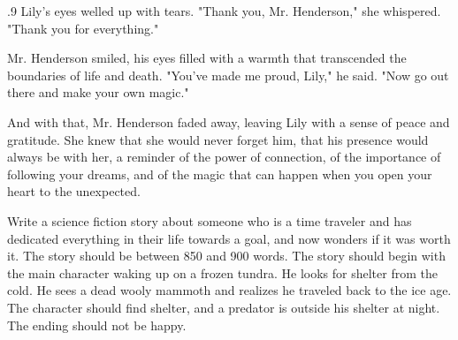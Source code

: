 \documentclass{article}
\newcommand{\Agentsroomzs}{\textsc{Agents' Room$_{ZS}$}}
\begin{document}
\begin{tcolorbox}[colback=white, colframe=gray!30!white, coltitle=black, parskip=5mm, title=
    \textbf{System output: \Agentsroomzs}, breakable]
\begin{spacing}{.9}
Lily's eyes welled up with tears. "Thank you, Mr. Henderson," she whispered. "Thank you for everything."\\\par

Mr. Henderson smiled, his eyes filled with a warmth that transcended the boundaries of life and death. "You've made me proud, Lily," he said. "Now go out there and make your own magic."\\\par

And with that, Mr. Henderson faded away, leaving Lily with a sense of peace and gratitude. She knew that she would never forget him, that his presence would always be with her, a reminder of the power of connection, of the importance of following your dreams, and of the magic that can happen when you open your heart to the unexpected.
    \end{spacing}
\end{tcolorbox}
    
\newpage
\begin{tcolorbox}[colback=white, colframe=my-green, coltitle=black, parskip=5mm, title=
    \textbf{Example Prompt}, breakable]
  \scriptsize
Write a science fiction story about someone who is a time traveler and has dedicated everything in their life towards a goal, and now wonders if it was worth it. The story should be between 850 and 900 words. The story should begin with the main character waking up on a frozen tundra. He looks for shelter from the cold. He sees a dead wooly mammoth and realizes he traveled back to the ice age. The character should find shelter, and a predator is outside his shelter at night. The ending should not be happy.
\end{tcolorbox}
\end{document}
